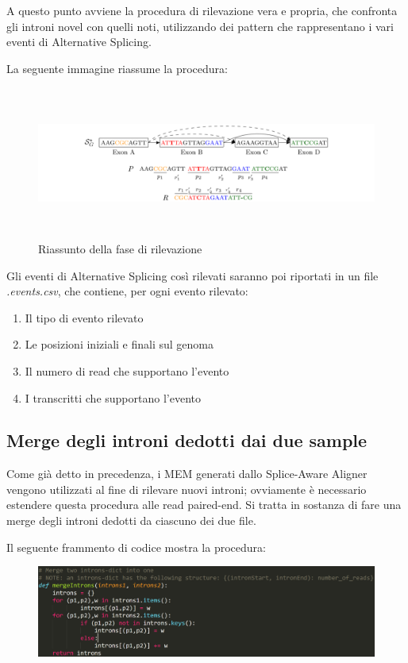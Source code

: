 A questo punto avviene la procedura di rilevazione vera e propria, che confronta gli introni novel con quelli noti, utilizzando dei pattern che rappresentano i vari eventi di Alternative Splicing.

La seguente immagine riassume la procedura:

\begin{figure}[h!]
	\centering
	\includegraphics[width=\linewidth, height=5cm]{images/riassuntorilevazione.png}
  \caption{Riassunto della fase di rilevazione}
  \label{fig:Summary2}
\end{figure}

\newpage

Gli eventi di Alternative Splicing così rilevati saranno poi riportati in un file \textit{.events.csv}, che contiene, per ogni evento rilevato:
\begin{enumerate}
	\item Il tipo di evento rilevato
	\item Le posizioni iniziali e finali sul genoma
	\item Il numero di read che supportano l'evento
	\item I transcritti che supportano l'evento
\end{enumerate}

\subsection{Merge degli introni dedotti dai due sample}

Come già detto in precedenza, i MEM generati dallo Splice-Aware Aligner vengono utilizzati al fine di rilevare nuovi introni; ovviamente è necessario estendere questa procedura alle read paired-end. Si tratta in sostanza di fare una merge degli introni dedotti da ciascuno dei due file.

Il seguente frammento di codice mostra la procedura:

\begin{figure}[h!]
	\centering
	\includegraphics[width=\linewidth]{images/mergeIntrons.png}
  \label{fig:MergeIntrons}
\end{figure}

